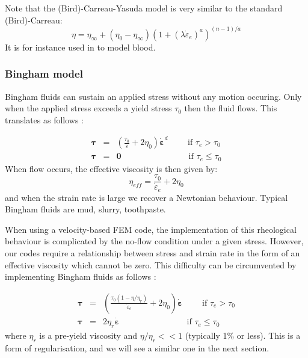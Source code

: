 Note that the (Bird)-Carreau-Yasuda model \cite{osru14} is very similar to the standard (Bird)-Carreau:
\begin{equation}
\eta = \eta_\infty + (\eta_0-\eta_\infty) \left(1 + (\lambda \dot{\varepsilon}_{e})^a \right)^{(n-1)/a}
\end{equation}
It is for instance used in \cite{vadv03} to model blood.

\Literature \cite{berc93,berc95,marc00}

\subsubsection{Bingham model} \label{sec:bingham}

Bingham fluids can sustain an applied stress without any motion occuring. Only when the applied stress exceeds
a yield stress $\tau_0$ then the fluid flows. This translates as follows \cite{reddybook2}:

\begin{eqnarray}
{\bm \tau} &=& \left(  \frac{\tau_0}{\dot{\varepsilon}} + 2 \eta_0  \right)\dot{\bm \varepsilon}^d \qquad 
\text{ if } {\tau}_{e}>\tau_0 \\
{\bm \tau} &=& {\bm 0} \qquad\qquad\qquad\qquad  \text{if } \tau_{e} \leq \tau_0 
\end{eqnarray}
When flow occurs, the effective viscosity is then given by:
\[
\eta_{eff} =  \frac{\tau_0}{\dot{\varepsilon}_e} + 2 \eta_0 
\]
and when the strain rate is large we recover a Newtonian behaviour.
Typical Bingham fluids are mud, slurry, toothpaste.  

When using a velocity-based FEM code, the implementation of this rheological behaviour 
is complicated by the no-flow condition under a given stress. However, our codes
require a relationship between stress and strain rate in the form of an effective viscosity
which cannot be zero. 
This difficulty can be circumvented by implementing Bingham fluids as follows \cite{reddybook2}:

\begin{eqnarray}
{\bm \tau} &=& \left(  \frac{\tau_0(1-\eta/\eta_r)}{\dot{\varepsilon}_e} 
+ 2 \eta_0  \right)\dot{\bm \varepsilon} \qquad \text{ if } \tau_{e}>\tau_0 \\
{\bm \tau} &=& 2 \eta_r \dot{\bm \varepsilon}  \qquad\qquad\qquad\qquad  
\text{if } \tau_{e} \leq \tau_0 
\end{eqnarray}
where $\eta_r$ is a pre-yield viscosity and $\eta/\eta_r<<1$ (typically 1\% or less). This is a form of 
regularisation, and we will see a similar one in the next section.

